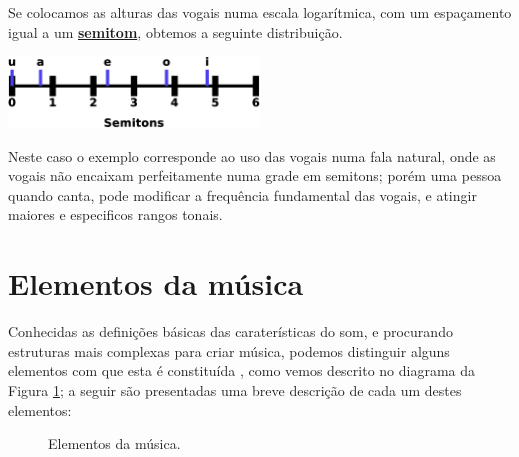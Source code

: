 \begin{elaboracion}[title=Timbre das vogais]
Se colocamos as alturas das vogais numa escala logarítmica, com um espaçamento igual a um
\hyperref[sec:pos:Semitom]{\textbf{semitom}},
obtemos a seguinte distribuição.
\begin{center}
\includegraphics[width=0.5\textwidth]{chapters/cap-musica-basica/vocales-semitons2a.eps}
\end{center}
Neste caso o exemplo corresponde ao uso das vogais numa fala natural, 
onde as vogais não encaixam perfeitamente numa grade em semitons;
porém uma pessoa quando canta, pode modificar a frequência fundamental das vogais,
e atingir maiores e especificos rangos tonais. 
\label{fig:timbresvocais}
\end{elaboracion}


\section{Elementos da música}
\label{sec:elementosmusica}
Conhecidas as definições básicas das caraterísticas do som, 
e procurando estruturas mais complexas para criar música,
podemos distinguir alguns elementos com que esta é constituída \cite[pp. 11]{alves2004teoria},
como vemos descrito no diagrama da Figura  \ref{fig:elementos:musica};
a seguir são presentadas uma breve descrição de cada um destes elementos:

\begin{figure}[!ht]
\centering
{} 
\caption{Elementos da música.}
\label{fig:elementos:musica}
\end{figure}

